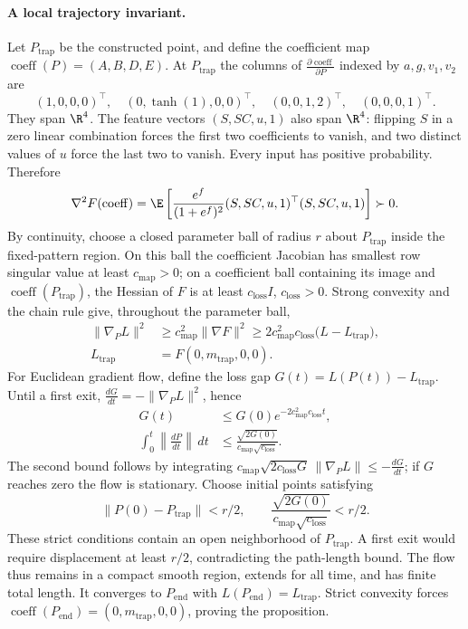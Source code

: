 \paragraph{A local trajectory invariant.}
Let $P_{\mathrm{trap}}$ be the constructed point, and define the coefficient map
$\operatorname{coeff}(P)=(A,B,D,E)$. At $P_{\mathrm{trap}}$ the columns of
$\frac{\partial\operatorname{coeff}}{\partial P}$ indexed by $a,g,v_1,v_2$ are
\[
 (1,0,0,0)^\top,\quad(0,\tanh(1),0,0)^\top,
 \quad(0,0,1,2)^\top,\quad(0,0,0,1)^\top.
\]
They span $\R^4$. The feature vectors $(S,SC,u,1)$ also span $\R^4$:
flipping $S$ in a zero linear combination forces the first two coefficients
to vanish, and two distinct values of $u$ force the last two to vanish.
Every input has positive probability. Therefore
\[
 \nabla^2 F(\operatorname{coeff})
 =\E\left[\frac{e^{f}}{(1+e^{f})^2}
 (S,SC,u,1)^\top(S,SC,u,1)\right]\succ0.
\]
By continuity, choose a closed parameter ball of radius $r$ about $P_{\mathrm{trap}}$
inside the fixed-pattern region. On this ball the coefficient Jacobian has
smallest row singular value at least $c_{\mathrm{map}}>0$; on a coefficient ball containing
its image and $\operatorname{coeff}(P_{\mathrm{trap}})$, the Hessian of $F$ is at least $c_{\mathrm{loss}} I$, $c_{\mathrm{loss}}>0$.
Strong convexity and the chain rule give, throughout the parameter ball,
\begin{equation}
\begin{aligned}
 \|\nabla_P L\|^2&\ge c_{\mathrm{map}}^2\|\nabla F\|^2
 \ge 2c_{\mathrm{map}}^2c_{\mathrm{loss}}\bigl(L-L_{\mathrm{trap}}\bigr),\\
 L_{\mathrm{trap}}&=F(0,m_{\mathrm{trap}},0,0).
\end{aligned}
 \label{eq:two-path-local-gradient}
\end{equation}
For Euclidean gradient flow, define the loss gap $G(t)=L(P(t))-L_{\mathrm{trap}}$.
Until a first exit, $\frac{dG}{dt}=-\|\nabla_P L\|^2$, hence
\[
\begin{aligned}
 G(t)&\le G(0)e^{-2c_{\mathrm{map}}^2c_{\mathrm{loss}} t},\\
 \int_0^t\left\|\frac{dP}{dt}\right\|\,dt
 &\le\frac{\sqrt{2G(0)}}{c_{\mathrm{map}}\sqrt{c_{\mathrm{loss}}}}.
\end{aligned}
\]
The second bound follows by integrating
$c_{\mathrm{map}}\sqrt{2c_{\mathrm{loss}} G}\,\|\nabla_P L\|\le-\frac{dG}{dt}$;
if $G$ reaches zero the flow is stationary.
Choose initial points satisfying
\begin{equation}
 \|P(0)-P_{\mathrm{trap}}\|<r/2,
 \qquad \frac{\sqrt{2G(0)}}{c_{\mathrm{map}}\sqrt{c_{\mathrm{loss}}}}<r/2.
 \label{eq:two-path-basin}
\end{equation}
These strict conditions contain an open neighborhood of $P_{\mathrm{trap}}$.
A first exit would require displacement at least $r/2$, contradicting
the path-length bound. The flow thus remains in a compact smooth region,
extends for all time, and has finite total length.
It converges to $P_{\mathrm{end}}$ with $L(P_{\mathrm{end}})=L_{\mathrm{trap}}$.
Strict convexity forces $\operatorname{coeff}(P_{\mathrm{end}})=(0,m_{\mathrm{trap}},0,0)$, proving the proposition.

